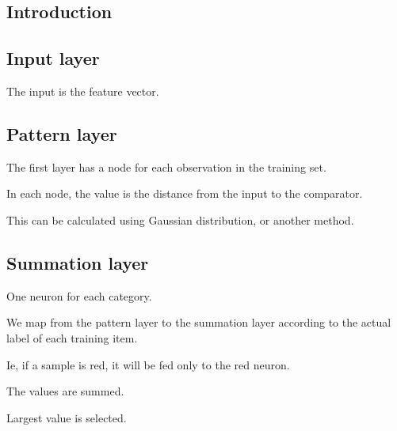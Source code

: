 
\subsection{Introduction}

\subsection{Input layer}

The input is the feature vector.

\subsection{Pattern layer}

The first layer has a node for each observation in the training set.

In each node, the value is the distance from the input to the comparator.

This can be calculated using Gaussian distribution, or another method.

\subsection{Summation layer}

One neuron for each category.

We map from the pattern layer to the summation layer according to the actual label of each training item.

Ie, if a sample is red, it will be fed only to the red neuron.

The values are summed.

Largest value is selected.

